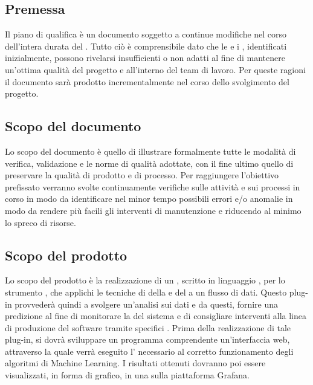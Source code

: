 \documentclass[../piano-di-qualifica.tex]{subfiles}
\begin{document}
\subsection{Premessa}%
\label{sub:premessa}
Il piano di qualifica è un documento soggetto a continue modifiche nel corso dell'intera durata del .
Tutto ciò è comprensibile dato che le  e i , identificati inizialmente, possono rivelarsi insufficienti o non adatti al fine di mantenere un'ottima qualità del progetto e all'interno del team di lavoro.
Per queste ragioni il documento sarà prodotto incrementalmente nel corso dello svolgimento del progetto.

\subsection{Scopo del documento}%
\label{sub:scopo_del_documento}
Lo scopo del documento è quello di illustrare formalmente tutte le modalità di verifica, validazione e le norme di qualità adottate, con il fine ultimo quello di preservare la qualità di prodotto e di processo.
Per raggiungere l'obiettivo prefissato verranno svolte continuamente verifiche sulle attività e sui processi in corso in modo da identificare nel minor tempo possibili errori e/o anomalie in modo da rendere più facili gli interventi di manutenzione e riducendo al minimo lo spreco di risorse.

\subsection{Scopo del prodotto}%
\label{sub:scopo_del_prodotto}
Lo scopo del prodotto è la realizzazione di un , scritto in linguaggio , per lo strumento  ,
che applichi le tecniche di  della  e del  a un flusso di dati.
Questo plug-in provvederà quindi a svolgere un'analisi sui dati e da questi, fornire una predizione al fine di monitorare la  del sistema e di consigliare 
interventi alla linea di produzione del software tramite specifici .
Prima della realizzazione di tale plug-in, si dovrà sviluppare un programma comprendente un'interfaccia web, attraverso la quale verrà eseguito l' necessario al corretto
funzionamento degli algoritmi di Machine Learning.
I risultati ottenuti dovranno poi essere visualizzati, in forma di grafico, in una  sulla piattaforma Grafana.
\end{document}
